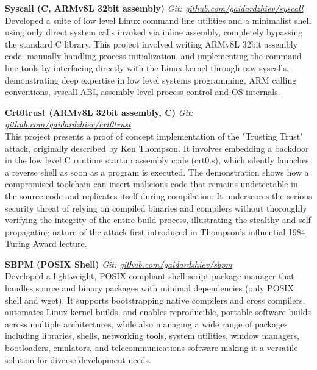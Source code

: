\documentclass[a4paper,10pt]{article}
\begin{document}
\noindent
\textbf{Syscall (C, ARMv8L 32bit assembly)} \hfill \textit{Git: \href{https://github.com/gaidardzhiev/syscall}{github.com/gaidardzhiev/syscall}} \\
Developed a suite of low level Linux command line utilities and a minimalist shell using only direct system calls invoked via inline assembly, completely bypassing the standard C library. This project involved writing ARMv8L 32bit assembly code, manually handling process initialization, and implementing the command line tools by interfacing directly with the Linux kernel through raw syscalls, demonstrating deep expertise in low level systems programming, ARM calling conventions, syscall ABI, assembly level process control and OS internals.

\vspace{6pt}

\noindent
\textbf{Crt0trust (ARMv8L 32bit assembly, C)} \hfill \textit{Git: \href{https://github.com/gaidardzhiev/crt0trust}{github.com/gaidardzhiev/crt0trust}} \\
This project presents a proof of concept implementation of the "Trusting Trust" attack, originally described by Ken Thompson. It involves embedding a backdoor in the low level C runtime startup assembly code (crt0.s), which silently launches a reverse shell as soon as a program is executed. The demonstration shows how a compromised toolchain can insert malicious code that remains undetectable in the source code and replicates itself during compilation. It underscores the serious security threat of relying on compiled binaries and compilers without thoroughly verifying the integrity of the entire build process, illustrating the stealthy and self propagating nature of the attack first introduced in Thompson's influential 1984 Turing Award lecture.

\vspace{6pt}

\noindent
\textbf{SBPM (POSIX Shell)} \hfill \textit{Git: \href{https://github.com/gaidardzhiev/sbpm}{github.com/gaidardzhiev/sbpm}} \\
Developed a lightweight, POSIX compliant shell script package manager that handles source and binary packages with minimal dependencies (only POSIX shell and wget). It supports bootstrapping native compilers and cross compilers, automates Linux kernel builds, and enables reproducible, portable software builds across multiple architectures, while also managing a wide range of packages including libraries, shells, networking tools, system utilities, window managers, bootloaders, emulators, and telecommunications software making it a versatile solution for diverse development needs.
\end{document}

